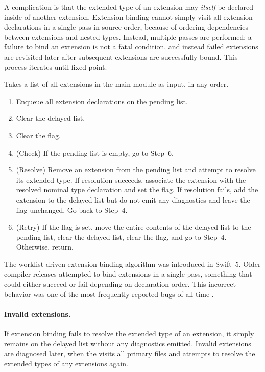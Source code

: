 \documentclass[../generics]{subfiles}
\begin{document}
A complication is that the extended type of an extension may \emph{itself} be declared inside of another extension. Extension binding cannot simply visit all extension declarations in a single pass in source order, because of ordering dependencies between extensions and nested types. Instead, multiple passes are performed; a failure to bind an extension is not a fatal condition, and instead failed extensions are revisited later after subsequent extensions are successfully bound. This process iterates until fixed point.
\begin{algorithm}\label{extension binding algorithm}
Takes a list of all extensions in the main module as input, in any order.
\begin{enumerate}
\item Enqueue all extension declarations on the pending list.
\item Clear the delayed list.
\item Clear the flag.
\item (Check) If the pending list is empty, go to Step~6.
\item (Resolve) Remove an extension from the pending list and attempt to resolve its extended type. If resolution succeeds, associate the extension with the resolved nominal type declaration and set the flag. If resolution fails, add the extension to the delayed list but do not emit any diagnostics and leave the flag unchanged. Go back to Step~4.
\item (Retry) If the flag is set, move the entire contents of the delayed list to the pending list, clear the delayed list, clear the flag, and go to Step~4. Otherwise, return.
\end{enumerate}
\end{algorithm}
The worklist-driven extension binding algorithm was introduced in Swift~5. Older compiler releases attempted to bind extensions in a single pass, something that could either succeed or fail depending on declaration order. This incorrect behavior was one of the most frequently reported bugs of all time \cite{sr631}.

\paragraph{Invalid extensions.} If extension binding fails to resolve the extended type of an extension, it simply remains on the delayed list without any diagnostics emitted. Invalid extensions are diagnosed later, when the  visits all primary files and attempts to resolve the extended types of any extensions again.
\end{document}
